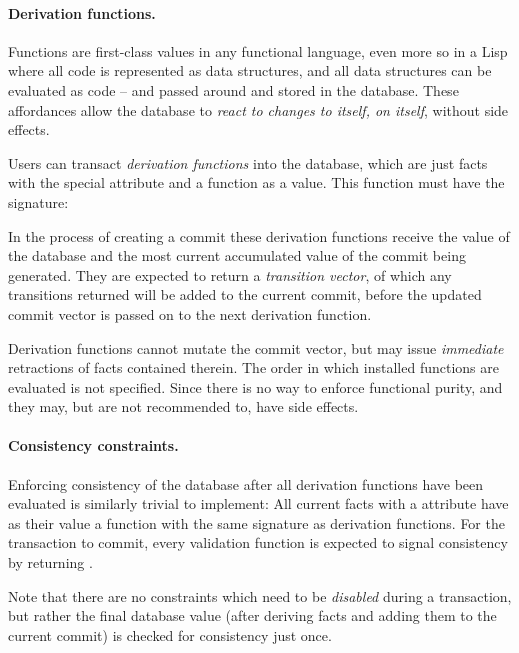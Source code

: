 \paragraph{Derivation functions.} Functions are first-class values in any functional language, even more so in a Lisp where all code is represented as data structures, and all data structures can be evaluated as code -- and passed around and stored in the database. These affordances allow the database to \emph{react to changes to itself, on itself}, without side effects.

Users can transact \emph{derivation functions} into the database, which are just facts with the special  attribute and a function as a value. This function must have the signature:

\begin{center}
  \lisp{($\lambda$ [db commit])}
\end{center}

In the process of creating a commit these derivation functions receive the value of the database and the most current accumulated value of the commit being generated. They are expected to return a \emph{transition vector}, of which any transitions returned will be added to the current commit, before the updated commit vector is passed on to the next derivation function.

Derivation functions cannot mutate the commit vector, but may issue \emph{immediate} retractions of facts contained therein. The order in which installed functions are evaluated is not specified. Since there is no way to enforce functional purity, and they may, but are not recommended to, have side effects.

\paragraph{Consistency constraints.} Enforcing consistency of the database after all derivation functions have been evaluated is similarly trivial to implement: All current facts with a  attribute have as their value a function with the same signature as derivation functions. For the transaction to commit, every validation function is expected to signal consistency by returning .

Note that there are no constraints which need to be \emph{disabled} during a transaction, but rather the final database value (after deriving facts and adding them to the current commit) is checked for consistency just once.



